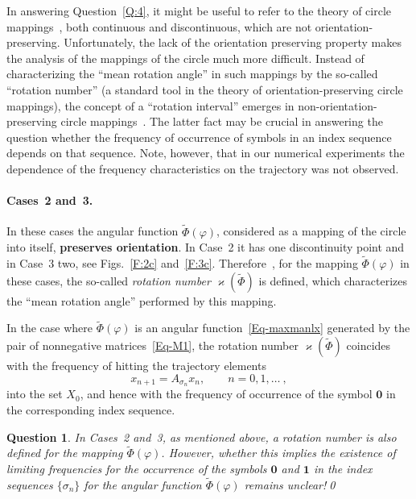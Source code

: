\documentclass[a4paper,10pt,reqno]{amsart}
\let\cite\citep
\newtheorem{question}{Question}
\begin{document}
In answering Question~\ref{Q:4}, it might be useful to refer to the theory of
circle mappings~\cite{Misiurewicz:ETDS86, ALM:N90, AM:AMUC96, AM:AMUC00,
Misiurewicz07}, both continuous and discontinuous, which are not
orientation-preserving. Unfortunately, the lack of the orientation preserving
property makes the analysis of the mappings of the circle much more
difficult. Instead of characterizing the ``mean rotation angle'' in such
mappings by the so-called ``rotation number'' (a standard tool in the theory
of orientation-preserving circle mappings), the concept of a ``rotation
interval'' emerges in non-orientation-preserving circle
mappings~\cite{Misiurewicz:ETDS86, ALM:N90, AM:AMUC00, Misiurewicz07}. The
latter fact may be crucial in answering the question whether the frequency of
occurrence of symbols in an index sequence depends on that sequence. Note,
however, that in our numerical experiments the dependence of the frequency
characteristics on the trajectory was not observed.

\paragraph{Cases~2 and~3.} In these cases the angular function
$\tilde{\varPhi}(\varphi)$, considered as a mapping of the circle into
itself, \textbf{preserves orientation}. In Case~2 it has one discontinuity
point and in Case~3 two, see Figs.~\ref{F:2c} and~\ref{F:3c}.
Therefore~\cite{Koz:CDC05:e, Koz:INFOPROC05:e, Koz:INFOPROC06:e}, for the
mapping $\tilde{\varPhi}(\varphi)$ in these cases, the so-called
\emph{rotation number} $\varkappa(\tilde{\varPhi})$ is defined, which
characterizes the ``mean rotation angle'' performed by this mapping.

In the case where $\tilde{\varPhi}(\varphi)$ is an angular
function~\eqref{Eq-maxmanlx} generated by the pair of nonnegative
matrices~\eqref{Eq-M1}, the rotation number $\varkappa(\tilde{\varPhi})$
coincides with the frequency of hitting the trajectory elements
\[
x_{n+1}=A_{\sigma_{n}}x_{n},\qquad n=0,1,\ldots~,
\]
into the set $X_{0}$, and hence with the frequency of occurrence of the
symbol $\boldsymbol{0}$ in the corresponding index sequence.

\begin{question}\label{Q:5}\rm
In Cases~2 and~3, as mentioned above, a rotation number is also defined for
the mapping $\tilde{\varPhi}(\varphi)$. However, whether this implies the
existence of limiting frequencies for the occurrence of the symbols
$\boldsymbol{0}$ and $\boldsymbol{1}$ in the index sequences $\{\sigma_{n}\}$
for the angular function $\tilde{\varPhi}(\varphi)$ remains unclear!\qed
\end{question}
\end{document}
